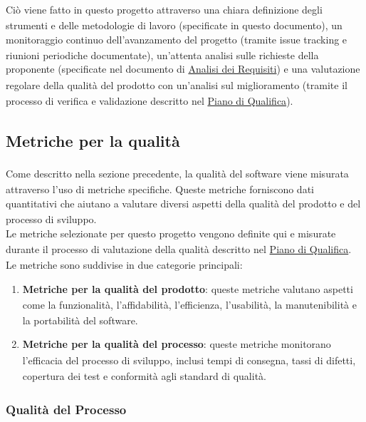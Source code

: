 \documentclass[a4paper,11pt]{article}
\newcommand{\G}{\textsubscript{\scalebox{0.6}{\textbf{G}}}}
\begin{document}
Ciò viene fatto in questo progetto\G{} attraverso una chiara definizione degli strumenti e delle metodologie di lavoro (specificate in questo documento), un monitoraggio continuo dell'avanzamento del progetto\G{} (tramite issue\G{} tracking e riunioni periodiche documentate), un'attenta analisi sulle richieste della proponente\G{} (specificate nel documento di \href{https://bugbustersunipd.github.io/DocumentazioneSWE/PB/ANALISI%20DEI%20REQUISITI/Analisi%20dei%20Requisiti.pdf}{Analisi dei Requisiti\G{}})  e una valutazione regolare della qualità\G{} del prodotto\G{} con un'analisi sul miglioramento (tramite il processo di verifica\G{} e validazione\G{} descritto nel \href{https://bugbustersunipd.github.io/DocumentazioneSWE/PB/PIANO%20DI%20QUALIFICA/Piano%20di%20Qualifica.pdf}{Piano di Qualifica\G{}}).

\subsection{Metriche per la qualità\G{}}
Come descritto nella sezione precedente, la qualità\G{} del software viene misurata attraverso l'uso di metriche specifiche. Queste metriche forniscono dati quantitativi che aiutano a valutare diversi aspetti della qualità\G{} del prodotto\G{} e del processo di sviluppo.\\
Le metriche selezionate per questo progetto\G{} vengono definite qui e misurate durante il processo di valutazione della qualità\G{} descritto nel \href{https://bugbustersunipd.github.io/DocumentazioneSWE/PB/PIANO%20DI%20QUALIFICA/Piano%20di%20Qualifica.pdf}{Piano di Qualifica\G{}}.\\
Le metriche sono suddivise in due categorie principali:
\begin{enumerate}
    \item \textbf{Metriche per la qualità\G{} del prodotto\G{}}: queste metriche valutano aspetti come la funzionalità\G{}, l'affidabilità\G{}, l'efficienza\G{}, l'usabilità, la manutenibilità\G{} e la portabilità del software.
    \item \textbf{Metriche per la qualità\G{} del processo}: queste metriche monitorano l'efficacia\G{} del processo di sviluppo, inclusi tempi di consegna, tassi di difetti, copertura dei test\G{}  e conformità agli standard di qualità\G{}.
\end{enumerate}
\subsubsection{Qualità\G{} del Processo}
\end{document}
